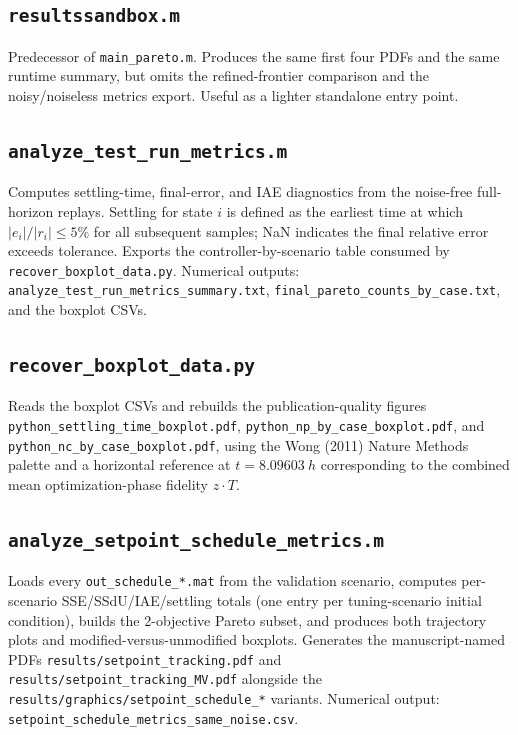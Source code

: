 \documentclass[11pt,a4paper]{article}
\begin{document}
\subsection{\texttt{resultssandbox.m}}
Predecessor of \texttt{main\_pareto.m}. Produces the same first four PDFs and the same runtime summary, but omits the refined-frontier comparison and the noisy/noiseless metrics export. Useful as a lighter standalone entry point.

\subsection{\texttt{analyze\_test\_run\_metrics.m}}
Computes settling-time, final-error, and IAE diagnostics from the noise-free full-horizon replays. Settling for state $i$ is defined as the earliest time at which $|e_i|/|r_i| \le 5\%$ for all subsequent samples; NaN indicates the final relative error exceeds tolerance. Exports the controller-by-scenario table consumed by \texttt{recover\_boxplot\_data.py}. Numerical outputs: \texttt{analyze\_test\_run\_metrics\_summary.txt}, \texttt{final\_pareto\_counts\_by\_case.txt}, and the boxplot CSVs.

\subsection{\texttt{recover\_boxplot\_data.py}}
Reads the boxplot CSVs and rebuilds the publication-quality figures \texttt{python\_settling\_time\_boxplot.pdf}, \texttt{python\_np\_by\_case\_boxplot.pdf}, and \texttt{python\_nc\_by\_case\_boxplot.pdf}, using the Wong (2011) Nature Methods palette and a horizontal reference at $t = \SI{8.09603}{h}$ corresponding to the combined mean optimization-phase fidelity $z \cdot T$.

\subsection{\texttt{analyze\_setpoint\_schedule\_metrics.m}}
Loads every \texttt{out\_schedule\_*.mat} from the validation scenario, computes per-scenario SSE/SSdU/IAE/settling totals (one entry per tuning-scenario initial condition), builds the 2-objective Pareto subset, and produces both trajectory plots and modified-versus-unmodified boxplots. Generates the manuscript-named PDFs \texttt{results/setpoint\_tracking.pdf} and \texttt{results/setpoint\_tracking\_MV.pdf} alongside the \texttt{results/graphics/setpoint\_schedule\_*} variants. Numerical output: \texttt{setpoint\_schedule\_metrics\_same\_noise.csv}.
\end{document}
